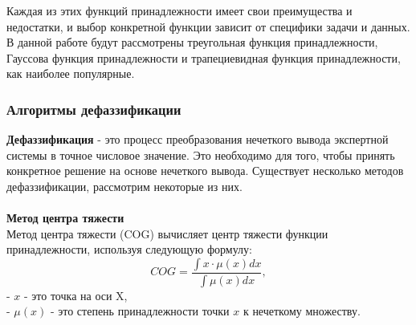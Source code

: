 \documentclass{article}
\begin{document}
    Каждая из этих функций принадлежности имеет свои преимущества и недостатки, и выбор конкретной функции зависит от специфики задачи и данных. В данной работе будут рассмотрены треугольная функция принадлежности, Гауссова функция принадлежности и трапециевидная функция принадлежности, как наиболее популярные.

    \subsubsection{Алгоритмы дефаззификации}
    \textbf{Дефаззификация} - это процесс преобразования нечеткого вывода экспертной системы в точное числовое значение. Это необходимо для того, чтобы принять конкретное решение на основе нечеткого вывода. Существует несколько методов дефаззификации, рассмотрим некоторые из них.\\
    ~\\
    \textbf{Метод центра тяжести}\\
    Метод центра тяжести (COG) вычисляет центр тяжести функции принадлежности, используя следующую формулу:\\

    \[
        COG = \frac{\int x \cdot \mu(x) dx}{\int \mu(x) dx},
    \]
    - \(x\) - это точка на оси X,\\
    - \(\mu(x)\) - это степень принадлежности точки \(x\) к нечеткому множеству.\\
\end{document}
